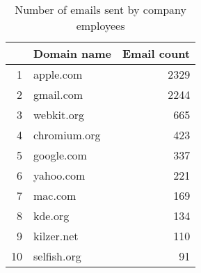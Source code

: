 \begin{table}[!htpb]
\begin{center}
\begin{tabular}{rlr}
  \hline
 & Domain name & Email count \\ 
  \hline
1 & apple.com & 2329 \\ 
  2 & gmail.com & 2244 \\ 
  3 & webkit.org & 665 \\ 
  4 & chromium.org & 423 \\ 
  5 & google.com & 337 \\ 
  6 & yahoo.com & 221 \\ 
  7 & mac.com & 169 \\ 
  8 & kde.org & 134 \\ 
  9 & kilzer.net & 110 \\ 
  10 & selfish.org &  91 \\ 
   \hline
\end{tabular}
\caption{Number of emails sent by company employees}
\label{emails:company}
\end{center}
\end{table}
